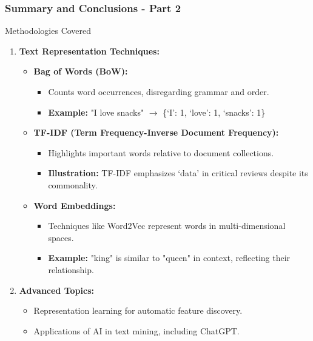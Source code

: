 \documentclass[aspectratio=169]{beamer}
\begin{document}
\begin{frame}[fragile]
    \frametitle{Summary and Conclusions - Part 2}
    \begin{block}{Methodologies Covered}
        \begin{enumerate}
            \item \textbf{Text Representation Techniques:}
            \begin{itemize}
                \item \textbf{Bag of Words (BoW):} 
                \begin{itemize}
                    \item Counts word occurrences, disregarding grammar and order.
                    \item \textbf{Example:} "I love snacks" $\rightarrow$ \{‘I’: 1, ‘love’: 1, ‘snacks’: 1\}
                \end{itemize}

                \item \textbf{TF-IDF (Term Frequency-Inverse Document Frequency):}
                \begin{itemize}
                    \item Highlights important words relative to document collections.
                    \item \textbf{Illustration:} TF-IDF emphasizes ‘data’ in critical reviews despite its commonality.
                \end{itemize}

                \item \textbf{Word Embeddings:}
                \begin{itemize}
                    \item Techniques like Word2Vec represent words in multi-dimensional spaces.
                    \item \textbf{Example:} "king" is similar to "queen" in context, reflecting their relationship.
                \end{itemize}
            \end{itemize}

            \item \textbf{Advanced Topics:}
            \begin{itemize}
                \item Representation learning for automatic feature discovery.
                \item Applications of AI in text mining, including ChatGPT.
            \end{itemize}
        \end{enumerate}
    \end{block}
\end{frame}
\end{document}

